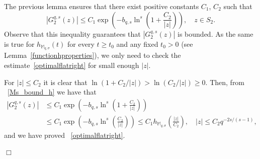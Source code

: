 \documentclass[11pt,a4paper]{article}
\theoremstyle{plain}
\theoremstyle{definition}
\newenvironment{proof1}{\medskip\par\noindent{\bf Proof.}}{\hfill $\Box$
\medskip\par}
\def\Ms{{\mathbb{M}}_{q,\sigma}}
\begin{document}
\begin{proof1}
The previous lemma ensures that there exist positive constants $C_1$, $C_2$ such that
\begin{equation}\label{G2-bound}
|G_2^{q,s}(z)|\leq C_1 \exp\left(-b_{q,s}\ln^s\left(1+\frac{C_2}{|z|}\right)\right),\quad z\in S_2.
\end{equation}
Observe that this inequality guarantees that $|G_2^{q,s}(z)|$ is bounded.
As the same is true for $h_{\Ms}(t)$ for every $t\ge t_0$ and any fixed $t_0>0$ (see Lemma~\ref{functionhproperties}), we only need to check the estimate~\eqref{optimalflatright} for small enough $|z|$.

For $|z|\le C_2$ it is clear that $\ln(1+C_2/|z|)>\ln(C_2/|z|)\ge 0$. Then, from
~\eqref{Ms_bound_h} we have that
\begin{align*}
|G_2^{q,s}(z)|&\leq C_1\exp\left(-b_{q,s}\ln^s\left(1+\frac{C_2}{|z|}\right)\right)\\
&\leq C_1 \exp\left(-b_{q,s}\ln^s\left(\frac{C_2}{|z|}\right)\right)
\leq C_1 h_{\Ms}\left(\frac{|z|}{C_2}\right),\quad |z|\leq C_2q^{-2s/(s-1)},
\end{align*}
and we have proved
~\eqref{optimalflatright}.


\end{proof1}
\end{document}
